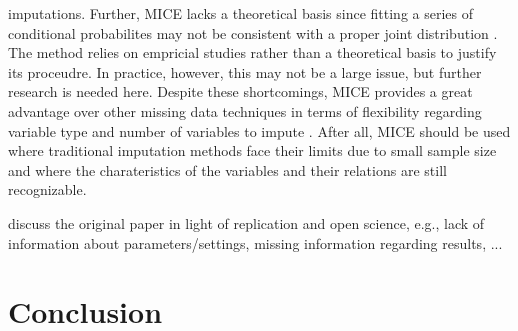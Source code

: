 imputations. Further, MICE lacks a theoretical basis since fitting a series of 
conditional probabilites may not be consistent with a proper joint distribution 
\cite{RN141}. The method relies on empricial studies rather than a theoretical 
basis to justify its proceudre. In practice, however, this may not be a large 
issue, but further research is needed here. Despite these shortcomings, MICE 
provides a great advantage over other missing data techniques in terms of 
flexibility regarding variable type and number of variables to impute 
\cite{RN141, RN142}. After all, MICE should be used where traditional 
imputation methods face their limits due to small sample size and where the 
charateristics of the variables and their relations are still recognizable.
\begin{changemargin}{50pt}{50pt}
discuss the original paper in light of replication and open science, e.g., lack 
of information about parameters/settings, missing information regarding 
results, ...
\end{changemargin}
\section{Conclusion}
